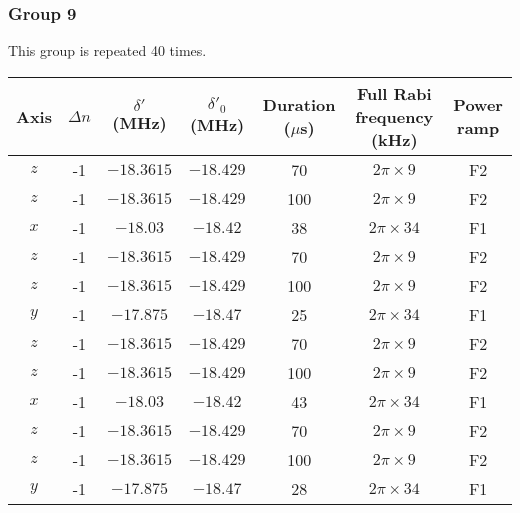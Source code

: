 \documentclass[aps,secnumarabic,amsmath,amssymb]{revtex4}
\begin{document}
\subsubsection{Group 9}
This group is repeated 40 times.
\begin{center}
  \begin{tabular}{|c|c|c|c|c|c|c|}
    \hline
    Axis&$\Delta n$&$\delta'$ (MHz)&$\delta'_0$ (MHz)&Duration ($\mu$s)&Full Rabi frequency (kHz)&Power ramp\\\hline
    $z$&-1&$-18.3615$&$-18.429$&70&$2\pi\times9$&F2\\\hline
    $z$&-1&$-18.3615$&$-18.429$&100&$2\pi\times9$&F2\\\hline
    $x$&-1&$-18.03$&$-18.42$&38&$2\pi\times34$&F1\\\hline
    $z$&-1&$-18.3615$&$-18.429$&70&$2\pi\times9$&F2\\\hline
    $z$&-1&$-18.3615$&$-18.429$&100&$2\pi\times9$&F2\\\hline
    $y$&-1&$-17.875$&$-18.47$&25&$2\pi\times34$&F1\\\hline
    $z$&-1&$-18.3615$&$-18.429$&70&$2\pi\times9$&F2\\\hline
    $z$&-1&$-18.3615$&$-18.429$&100&$2\pi\times9$&F2\\\hline
    $x$&-1&$-18.03$&$-18.42$&43&$2\pi\times34$&F1\\\hline
    $z$&-1&$-18.3615$&$-18.429$&70&$2\pi\times9$&F2\\\hline
    $z$&-1&$-18.3615$&$-18.429$&100&$2\pi\times9$&F2\\\hline
    $y$&-1&$-17.875$&$-18.47$&28&$2\pi\times34$&F1\\\hline
  \end{tabular}
\end{center}


\end{document}
